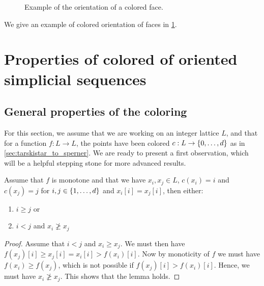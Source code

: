 \begin{figure}[ht]
	\centering
	\caption[Orientation of colored faces]{Example of the orientation of a colored face.}\label{fig:orientation_of_colored_faces}
\end{figure}

We give an example of colored orientation of faces in \cref{fig:orientation_of_colored_faces}.

\section{Properties of colored of oriented simplicial sequences}

\subsection{General properties of the coloring}

For this section, we assume that we are working on an integer lattice $L$, and that for a function $f: L \rightarrow L$, the points have been colored $c : L \rightarrow \left\{0, \dots, d\right\}$ as in \cref{sec:tarskistar_to_sperner}. We are ready to present a first observation, which will be a helpful stepping stone for more advanced results.

\begin{lemma}\label{lem:monotone_coloring}
	Assume that $f$ is monotone and that we have $x_i, x_j \in L$, $c(x_i) = i$ and $c(x_j) = j$ for $i, j \in \left\{1, \dots, d\right\}$ and $x_i[i] = x_j[i]$, then either:
	\begin{enumerate}
		\item $i \geq j$ or
		\item $i < j$ and $x_i \not\geq x_j$
	\end{enumerate}
\end{lemma}
\begin{proof}
	Assume that $i < j$ and $x_i \geq x_j$. We must then have $f(x_j)[i] \geq x_j[i] = x_i[i] > f(x_i)[i]$. Now by monoticity of $f$ we must have $f(x_i) \geq f(x_j)$, which is not possible if $f(x_j)[i] > f(x_i)[i]$. Hence, we must have $x_i \not\geq x_j$. This shows that the lemma holds.
\end{proof}

